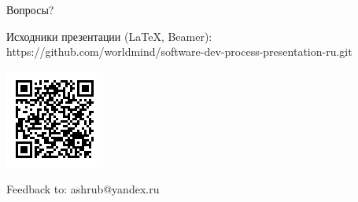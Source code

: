 \documentclass[aspectratio=169]{beamer}
\begin{document}
\begin{frame}{Вопросы?}
\begin{block}{Исходники презентации (LaTeX, Beamer):}
https://github.com/worldmind/software-dev-process-presentation-ru.git
\begin{center}
\includegraphics{qr-git-url.png}
\end{center}
\end{block}
\begin{block}{Feedback to: ashrub@yandex.ru}
\end{block}

\end{frame}
\end{document}
